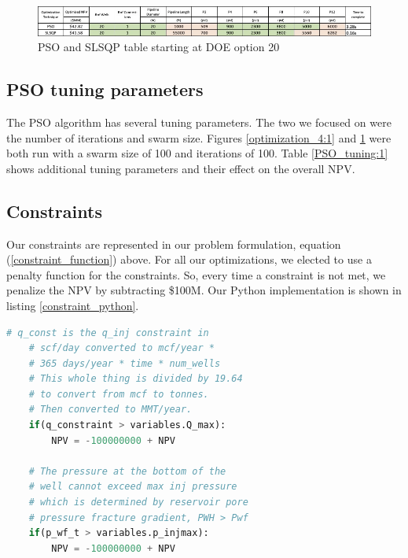 \documentclass[balance,upint,subscriptcorrection,varvw,mathalfa=cal=boondoxo,spanish,french,vietnamese,russian,greek,pdf-a,colorlinks]{asmeconf}
\begin{document}

\begin{figure}[btp]
\centering\includegraphics[width=0.7\linewidth]{images/optimization_point_20.jpg}
\caption{PSO and SLSQP table starting at DOE option 20}\label{optimization_20:1}
\end{figure}


\subsection*{PSO tuning parameters}
The PSO algorithm has several tuning parameters. The two we focused on were the number of iterations and swarm size. Figures \ref{optimization_4:1} and \ref{optimization_20:1} were both run with a swarm size of 100 and iterations of 100. Table \ref{PSO_tuning:1} shows additional tuning parameters and their effect on the overall NPV. 

\subsection*{Constraints}
Our constraints are represented in our problem formulation, equation (\ref{constraint_function}) above. For all our optimizations, we elected to use a penalty function for the constraints. So, every time a constraint is not met, we penalize the NPV by subtracting \$100M. Our Python implementation is shown in listing \ref{constraint_python}.

\begin{lstlisting}[language=Python, caption=Constraint Code, label=constraint_python]
    # q_const is the q_inj constraint in 
    # scf/day converted to mcf/year * 
    # 365 days/year * time * num_wells
    # This whole thing is divided by 19.64 
    # to convert from mcf to tonnes. 
    # Then converted to MMT/year.
    if(q_constraint > variables.Q_max):
        NPV = -100000000 + NPV

    # The pressure at the bottom of the 
    # well cannot exceed max inj pressure 
    # which is determined by reservoir pore 
    # pressure fracture gradient, PWH > Pwf
    if(p_wf_t > variables.p_injmax):
        NPV = -100000000 + NPV
\end{lstlisting}
\end{document}
